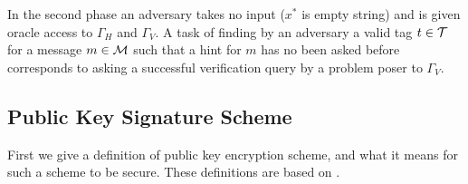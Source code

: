 In the second phase an adversary takes no input ($x^*$ is empty string) and is given oracle access to $\Gamma_H$ and $\Gamma_V$.
A task of finding by an adversary a valid tag $t \in \mathcal{T}$ for a message $m \in \mathcal{M}$ such that a hint for $m$ has no been asked before
corresponds to asking a successful verification query by a problem poser to $\Gamma_V$.
%
\subsection{Public Key Signature Scheme}
First we give a definition of public key encryption scheme, and what it means for such a scheme to be secure.
These definitions are based on \cite{Goldreich:2004:FCV:975541}.

